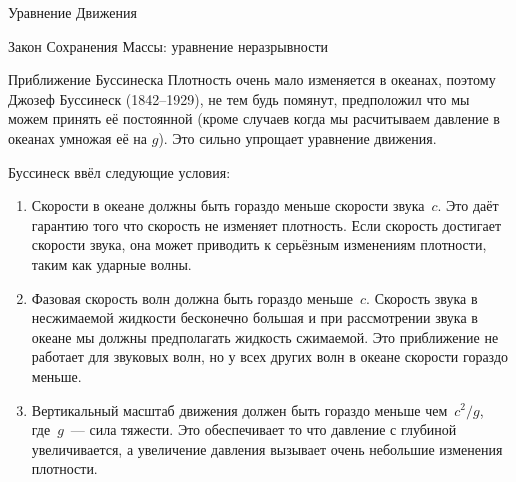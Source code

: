 \begin{chapter}{Уравнение Движения}
\begin{section}{Закон Сохранения Массы: уравнение неразрывности}
\begin{paragraph}{Приближение Буссинеска}
Плотность очень мало изменяется в океанах, поэтому Джозеф Буссинеск
(1842--1929), не тем будь помянут, предположил что мы можем принять
её постоянной (кроме случаев когда мы расчитываем давление в океанах
умножая её на $g$). Это сильно упрощает уравнение движения. 
%

Буссинеск ввёл следующие условия:
\begin{enumerate}
\item
Скорости в океане должны быть гораздо меньше скорости звука~$c$. Это
даёт гарантию того что скорость не изменяет плотность. Если скорость
достигает скорости звука, она может приводить к серьёзным изменениям
плотности, таким как ударные волны.
%

\item
Фазовая скорость волн должна быть гораздо меньше~$c$. Скорость звука в
несжимаемой жидкости бесконечно большая и при рассмотрении звука в
океане мы должны предполагать жидкость сжимаемой. Это приближение не
работает для звуковых волн, но у всех других волн в океане скорости
гораздо меньше.
%

\item
Вертикальный масштаб движения должен быть гораздо меньше чем~$c^2/g$,
где~$g$~--- сила тяжести. Это обеспечивает то что давление с глубиной
увеличивается, а увеличение давления вызывает очень небольшие
изменения плотности.
%
\end{enumerate}


\end{paragraph}
\end{section}
\end{chapter}
